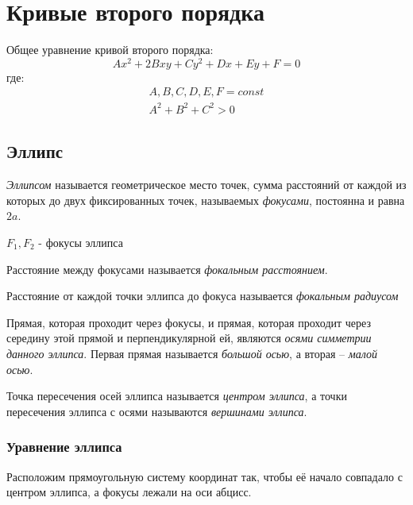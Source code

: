 \section{Кривые второго порядка}

Общее уравнение кривой второго порядка:
\[
Ax^2 + 2Bxy + Cy^2 + Dx + Ey + F = 0
\] 
где:
\begin{gather*}
  A, B, C, D, E, F = const \\
  A^2 + B^2 + C^2 > 0
\end{gather*}

\subsection{Эллипс}

\begin{definition}
  \textit{Эллипсом} называется геометрическое место точек, сумма расстояний от каждой из которых до двух фиксированных точек, называемых \textit{фокусами}, постоянна и равна $2a$.
\end{definition}

$F_1, F_2$ - фокусы эллипса

Расстояние между фокусами называется \textit{фокальным расстоянием}.

Расстояние от каждой точки эллипса до фокуса называется \textit{фокальным радиусом} 

Прямая, которая проходит через фокусы, и прямая, которая проходит через середину этой прямой и перпендикулярной ей, являются \textit{осями симметрии данного эллипса}.
Первая прямая называется \textit{большой осью}, а вторая -- \textit{малой осью}.   

Точка пересечения осей эллипса называется \textit{центром эллипса}, а точки пересечения эллипса с осями называются \textit{вершинами эллипса}. 

\subsubsection*{Уравнение эллипса}

Расположим прямоугольную систему координат так, чтобы её начало совпадало с центром эллипса, а фокусы лежали на оси абцисс.

